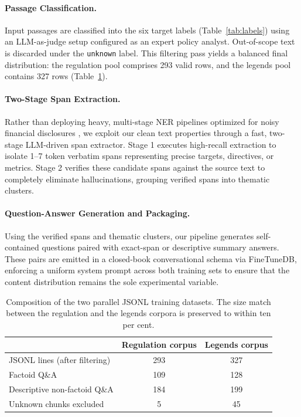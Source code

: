 \documentclass[pdflatex,sn-mathphys-num]{sn-jnl}%
\theoremstyle{thmstyleone}%
\theoremstyle{thmstyletwo}%
\theoremstyle{thmstylethree}%
\begin{document}
\paragraph{Passage Classification.} Input passages are classified into the six
target labels (Table~\ref{tab:labels}) using an LLM-as-judge setup configured as
an expert policy analyst. Out-of-scope text is discarded under the
\texttt{unknown} label. This filtering pass yields a balanced final
distribution: the regulation pool comprises 293 valid rows, and the legends pool
contains 327 rows (Table~\ref{tab:datasets}).

\paragraph{Two-Stage Span Extraction.} Rather than deploying heavy, multi-stage
NER pipelines optimized for noisy financial disclosures \citep{vutukuri2023esg},
we exploit our clean text properties through a fast, two-stage LLM-driven span
extractor. Stage 1 executes high-recall extraction to isolate 1--7 token
verbatim spans representing precise targets, directives, or metrics. Stage 2
verifies these candidate spans against the source text to completely eliminate
hallucinations, grouping verified spans into thematic clusters.

\paragraph{Question-Answer Generation and Packaging.} Using the verified spans
and thematic clusters, our pipeline generates self-contained questions paired
with exact-span or descriptive summary answers. These pairs are emitted in a
closed-book conversational schema via FineTuneDB, enforcing a uniform system
prompt across both training sets to ensure that the content distribution remains
the sole experimental variable.

\begin{table}[htbp]
\centering
\caption{Composition of the two parallel JSONL training datasets. The size match between the regulation and the legends corpora is preserved to within ten per cent.}
\label{tab:datasets}
\vspace{2mm}
\begin{tabular}{lcc}
\toprule
& \textbf{Regulation corpus} & \textbf{Legends corpus} \\
\midrule
JSONL lines (after filtering) & 293 & 327 \\ 
Factoid Q\&A & 109 & 128 \\
Descriptive non-factoid Q\&A & 184 & 199 \\ 
Unknown chunks excluded & 5 & 45 \\
\bottomrule
\end{tabular}
\end{table}
\end{document}
